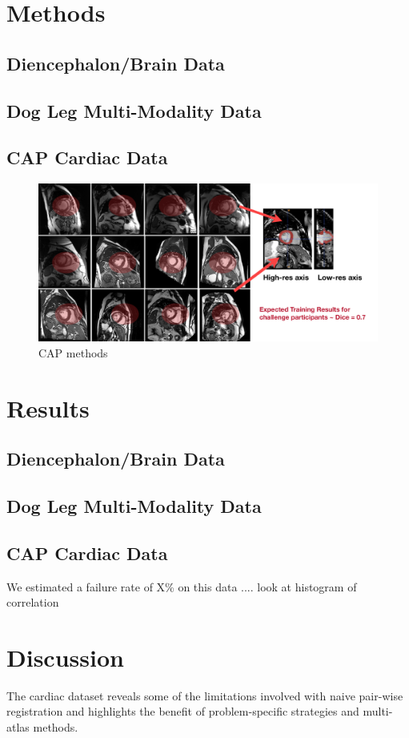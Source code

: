 \documentclass{llncs}
\begin{document}
\section{Methods}

\subsection{Diencephalon/Brain Data}

\subsection{Dog Leg Multi-Modality Data}

\subsection{CAP Cardiac Data}
\begin{figure}[t]
 \centering 
  \includegraphics[width=5in]{../figs/CAP_methods.pdf}
 \caption{CAP methods}
 \label{fig:CAPmethods}
\end{figure}

\section{Results}

\subsection{Diencephalon/Brain Data}

\subsection{Dog Leg Multi-Modality Data}

\subsection{CAP Cardiac Data}
We estimated a failure rate of X\% on this data  .... look at
histogram of correlation 

\section{Discussion}

The cardiac dataset reveals some of the limitations involved with naive
pair-wise registration and highlights the benefit of
problem-specific strategies and multi-atlas methods.  



\end{document}
